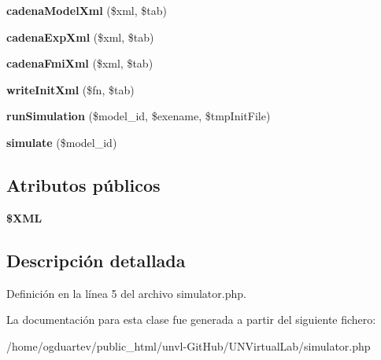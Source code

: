 \begin{DoxyCompactItemize}
{\bfseries cadena\+Model\+Xml} (\$xml, \$tab)
\item 
\mbox{\label{classsimulator_a1a13b97820999ff1e9aedd046d03f8aa}} 
{\bfseries cadena\+Exp\+Xml} (\$xml, \$tab)
\item 
\mbox{\label{classsimulator_a5d5ccd8544c32ebd959e09ca16133a0c}} 
{\bfseries cadena\+Fmi\+Xml} (\$xml, \$tab)
\item 
\mbox{\label{classsimulator_af9b860cbf6812dfb766be1bfe8b9e741}} 
{\bfseries write\+Init\+Xml} (\$fn, \$tab)
\item 
\mbox{\label{classsimulator_a5167700851518332f76a993b14875364}} 
{\bfseries run\+Simulation} (\$model\+\_\+id, \$exename, \$tmp\+Init\+File)
\item 
\mbox{\label{classsimulator_ac2a0fdfba4df28bdcd947e691e09eafd}} 
{\bfseries simulate} (\$model\+\_\+id)
\end{DoxyCompactItemize}
\subsection*{Atributos públicos}
\begin{DoxyCompactItemize}
\item 
\mbox{\label{classsimulator_acab8cf77a5b3f2863119c5a96f613785}} 
{\bfseries \$\+X\+ML}
\end{DoxyCompactItemize}


\subsection{Descripción detallada}


Definición en la línea 5 del archivo simulator.\+php.



La documentación para esta clase fue generada a partir del siguiente fichero\+:\begin{DoxyCompactItemize}
\item 
/home/ogduartev/public\+\_\+html/unvl-\/\+Git\+Hub/\+U\+N\+Virtual\+Lab/simulator.\+php\end{DoxyCompactItemize}
